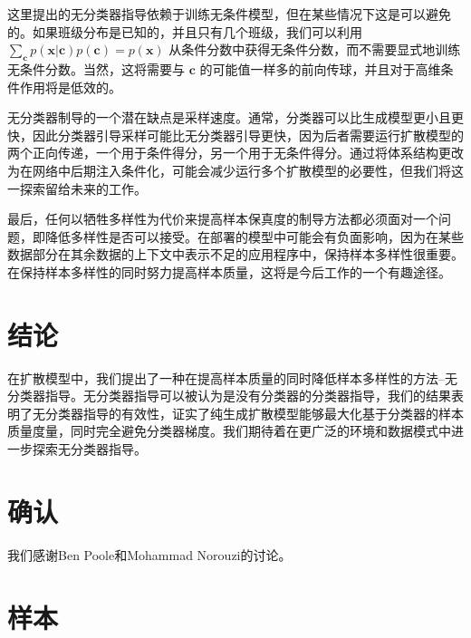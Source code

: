 \documentclass{article}
\newcommand{\bc}{\mathbf{c}}
\newcommand{\bx}{\mathbf{x}}
\begin{document}
这里提出的无分类器指导依赖于训练无条件模型，但在某些情况下这是可以避免的。如果班级分布是已知的，并且只有几个班级，我们可以利用 $\sum_\bc p(\bx|\bc) p(\bc) = p(\bx)$ 从条件分数中获得无条件分数，而不需要显式地训练无条件分数。当然，这将需要与 $\bc$ 的可能值一样多的前向传球，并且对于高维条件作用将是低效的。


无分类器制导的一个潜在缺点是采样速度。通常，分类器可以比生成模型更小且更快，因此分类器引导采样可能比无分类器引导更快，因为后者需要运行扩散模型的两个正向传递，一个用于条件得分，另一个用于无条件得分。通过将体系结构更改为在网络中后期注入条件化，可能会减少运行多个扩散模型的必要性，但我们将这一探索留给未来的工作。


最后，任何以牺牲多样性为代价来提高样本保真度的制导方法都必须面对一个问题，即降低多样性是否可以接受。在部署的模型中可能会有负面影响，因为在某些数据部分在其余数据的上下文中表示不足的应用程序中，保持样本多样性很重要。在保持样本多样性的同时努力提高样本质量，这将是今后工作的一个有趣途径。


 \section{
结论} 


在扩散模型中，我们提出了一种在提高样本质量的同时降低样本多样性的方法--无分类器指导。无分类器指导可以被认为是没有分类器的分类器指导，我们的结果表明了无分类器指导的有效性，证实了纯生成扩散模型能够最大化基于分类器的样本质量度量，同时完全避免分类器梯度。我们期待着在更广泛的环境和数据模式中进一步探索无分类器指导。


 \section{
确认} 我们感谢Ben Poole和Mohammad Norouzi的讨论。


 \FloatBarrier 


  
  


 \newpage 
 \appendix 
 \section{
样本} 
\end{document}
